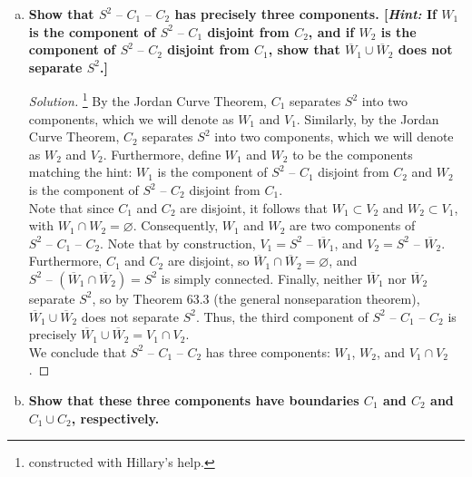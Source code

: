 \documentclass[11pt]{article}
\newenvironment{solution}
  {\renewcommand\qedsymbol{$\blacksquare$}\begin{proof}[Solution]}
  {\end{proof}}
\begin{document}
\begin{enumerate}[a)]
    \item \textbf{Show that $S^2 \text{ -- } C_1 \text{ -- } C_2$ has precisely three components. [\textit{Hint:} If $W_1$ is the component
    of $S^2 \text{ -- } C_1$ disjoint from $C_2$, and if $W_2$ is the component of $S^2 \text{ -- } C_2$ disjoint from $C_1$, show that
    $\overline{W}_1 \cup \overline{W}_2$ does not separate $S^2$.]}

    \begin{solution}\footnote{constructed with Hillary's help.}
    By the Jordan Curve Theorem, $C_1$ separates $S^2$ into two components, which we will denote as $W_1$ and $V_1$.
    Similarly, by the Jordan Curve Theorem, $C_2$ separates $S^2$ into two components, which we will denote as $W_2$ and $V_2$. Furthermore, define
    $W_1$ and $W_2$ to be the components matching the hint: $W_1$ is the component of $S^2 \text{ -- } C_1$ disjoint from $C_2$ and $W_2$ is the component of $S^2 \text{ -- } C_2$ disjoint from $C_1$. \\
    
    Note that since $C_1$ and $C_2$ are disjoint, it follows that $W_1 \subset V_2$ and $W_2 \subset V_1$, with $W_1 \cap W_2 = \varnothing$. Consequently, $W_1$ and $W_2$ are two components 
    of $S^2 \text{ -- } C_1 \text{ -- } C_2$. Note that by construction, $V_1 = S^2 \text{ -- } \overline{W}_1$, and $V_2 = S^2 \text{ -- } \overline{W}_2$. 
    Furthermore, $C_1$ and $C_2$ are disjoint, so $\overline{W}_1 \cap \overline{W}_2 = \varnothing$, and $S^2 \text{ -- } (\overline{W}_1 \cap \overline{W}_2) = S^2$ is simply connected. Finally, 
    neither $\overline{W}_1$ nor $\overline{W}_2$ separate $S^2$, so by Theorem 63.3 (the general nonseparation theorem), $\overline{W}_1 \cup \overline{W}_2$ does not separate $S^2$. Thus, the 
    third component of $S^2 \text { -- } C_1 \text{ -- } C_2$ is precisely $\overline{W}_1 \cup \overline{W}_2 = V_1 \cap V_2$. \\

    We conclude that $S^2 \text { -- } C_1 \text{ -- } C_2$ has three components: $W_1$, $W_2$, and $V_1 \cap V_2$. 
    \end{solution}
    
    \item \textbf{Show that these three components have boundaries $C_1$ and $C_2$ and $C_1 \cup C_2$, respectively.}
    

\end{enumerate}
\end{document}
